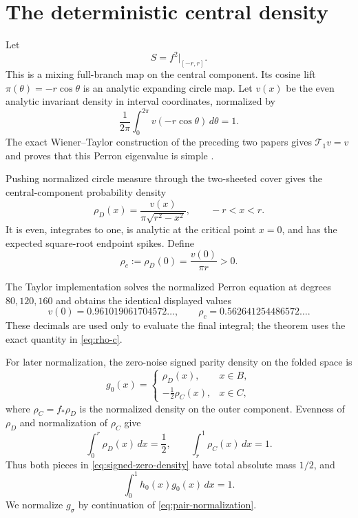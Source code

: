 \documentclass[11pt]{article}
\theoremstyle{definition}
\theoremstyle{remark}
\newcommand{\cT}{\mathcal T}
\begin{document}
\section{The deterministic central density}
\label{sec:density}

Let
\begin{equation}\label{eq:central-square}
 S=f^2|_{[-r,r]}.
\end{equation}
This is a mixing full-branch map on the central component.  Its cosine lift
$\pi(\theta)=-r\cos\theta$ is an analytic expanding circle map.  Let
$v(x)$ be the even analytic invariant density in interval coordinates,
normalized by
\begin{equation}\label{eq:v-normalization}
 \frac1{2\pi}\int_0^{2\pi}v(-r\cos\theta)\,d\theta=1.
\end{equation}
The exact Wiener--Taylor construction of the preceding two papers gives
$\cT_1v=v$ and proves that this Perron eigenvalue is simple
\citep{WangPostcritical2026,WangValidatedGap2026}.

Pushing normalized circle measure through the two-sheeted cover gives the
central-component probability density
\begin{equation}\label{eq:rho-D}
 \rho_D(x)=\frac{v(x)}{\pi\sqrt{r^2-x^2}},
 \qquad -r<x<r.
\end{equation}
It is even, integrates to one, is analytic at the critical point $x=0$, and
has the expected square-root endpoint spikes.  Define
\begin{equation}\label{eq:rho-c}
 \rho_c:=\rho_D(0)=\frac{v(0)}{\pi r}>0.
\end{equation}

The Taylor implementation solves the normalized Perron equation at degrees
$80,120,160$ and obtains the identical displayed values
\begin{equation}\label{eq:rho-c-numerical}
 v(0)=0.961019061704572\ldots,
 \qquad
 \rho_c=0.562641254486572\ldots.
\end{equation}
These decimals are used only to evaluate the final integral; the theorem uses
the exact quantity in \eqref{eq:rho-c}.

For later normalization, the zero-noise signed parity density on the folded
space is
\begin{equation}\label{eq:signed-zero-density}
 g_0(x)=
 \begin{cases}
  \rho_D(x),&x\in B,\\
  -\frac12\rho_C(x),&x\in C,
 \end{cases}
\end{equation}
where $\rho_C=f_*\rho_D$ is the normalized density on the outer component.
Evenness of $\rho_D$ and normalization of $\rho_C$ give
\begin{equation}\label{eq:folded-masses}
 \int_0^r\rho_D(x)\,dx=\frac12,
 \qquad
 \int_r^1\rho_C(x)\,dx=1.
\end{equation}
Thus both pieces in \eqref{eq:signed-zero-density} have total absolute mass
$1/2$, and
\begin{equation}\label{eq:pair-normalization}
 \int_0^1h_0(x)g_0(x)\,dx=1.
\end{equation}
We normalize $g_\sigma$ by continuation of
\eqref{eq:pair-normalization}.
\end{document}

